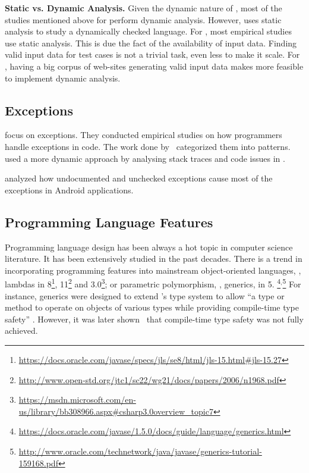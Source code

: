 \textbf{Static vs. Dynamic Analysis.}
Given the dynamic nature of \javascript, most of the studies mentioned
above for \javascript{} perform dynamic analysis.
However, \cite{callauHowWhyDevelopers2013} uses static analysis to study
a dynamically checked language.
For \java, most empirical studies use static analysis.
This is due the fact of the availability of input data.
Finding valid input data for test cases is not a trivial task,
even less to make it scale.
For \javascript, having a big corpus of web-sites generating valid
input data makes more feasible to implement dynamic analysis.

\subsection*{Exceptions}

\cite{keryExaminingProgrammerPractices2016,asaduzzamanHowDevelopersUse2016} focus on exceptions.
They conducted empirical studies on how programmers handle exceptions in \java{} code.
The work done by~\cite{nakshatriAnalysisExceptionHandling2016} categorized them into patterns.
\cite{coelhoUnveilingExceptionHandling2015} used a more dynamic approach by analysing stack traces and code issues in \github{}.

\cite{kechagiaUndocumentedUncheckedExceptions2014} analyzed how undocumented and
unchecked exceptions cause most of the exceptions in
Android applications.

\subsection*{Programming Language Features}

Programming language design has been always a hot topic in computer science literature.
It has been extensively studied in the past decades.
There is a trend in incorporating
programming features into mainstream object-oriented languages, \eg,
lambdas in \java{} 8\footnote{\url{https://docs.oracle.com/javase/specs/jls/se8/html/jls-15.html\#jls-15.27}},
\cpp{}11\footnote{\url{http://www.open-std.org/jtc1/sc22/wg21/docs/papers/2006/n1968.pdf}} and
\csharp{} 3.0\footnote{\url{https://msdn.microsoft.com/en-us/library/bb308966.aspx\#csharp3.0overview\_topic7}};
or parametric polymorphism, \ie{}, generics, in \java{} 5.%
\footnote{\url{https://docs.oracle.com/javase/1.5.0/docs/guide/language/generics.html}}\(^{,}\)\footnote{\url{http://www.oracle.com/technetwork/java/javase/generics-tutorial-159168.pdf}}
For instance, \java{} generics were designed to extend
\java's type system to allow
``a type or method to operate on objects of various types while
providing compile-time type safety''
\citep{goslingJavaLanguageSpecification}.
However, it was later shown~\citep{aminJavaScalaType2016} that 
compile-time type safety was not fully achieved.

